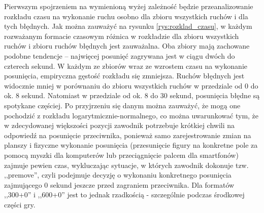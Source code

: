 \documentclass[inzynierska]{pwr_wmat_praca_dyplomowa}
\theoremstyle{plain}
\numberwithin{theorem}{chapter}
\theoremstyle{definition}
\numberwithin{theorem}{chapter}
\begin{document}
Pierwszym spojrzeniem na wymienioną wyżej zależność będzie przeanalizowanie rozkładu czasu na wykonanie ruchu osobno dla zbioru wszystkich ruchów i dla tych błędnych. Jak można zauważyć na rysunku \ref{rys:rozklad_czasu}, w każdym rozważanym formacie czasowym różnica w rozkładzie dla zbioru wszystkich ruchów i zbioru ruchów błędnych jest zauważalna. Oba zbiory mają zachowane podobne tendencje -- najwięcej posunięć zagrywana jest w ciągu dwóch do czterech sekund. W każdym ze zbiorów wraz ze wzrostem czasu na wykonanie posunięcia, empiryczna gęstość rozkładu się zmniejsza. Ruchów błędnych jest widocznie mniej w porównaniu do zbioru wszystkich ruchów w przedziale od 0 do ok. 8 sekund. Natomiast w przedziale od ok. 8 do 30 sekund, posunięcia błędne są spotykane częściej.
Po przyjrzeniu się danym można zauważyć, że mogą one pochodzić z rozkładu logarytmicznie-normalnego, co można uwarunkować tym, że w zdecydowanej większości pozycji zawodnik potrzebuje krótkiej chwili na odpowiedź na posunięcie przeciwnika, ponieważ samo zarejestrowanie zmian na planszy i fizyczne wykonanie posunięcia (przesunięcie figury na konkretne pole za pomocą myszki dla komputerów lub przeciągnięcie palcem dla smartfonów) zajmuje pewien czas, wykluczając sytuacje, w których zawodnik dokonuje tzw. ,,premove'', czyli podejmuje decyzję o wykonaniu konkretnego posunięcia zajmującego 0 sekund jeszcze przed zagraniem przeciwnika. Dla formatów ,,300+0'' i ,,600+0'' jest to jednak rzadkością - szczególnie podczas środkowej części gry.
\end{document}
